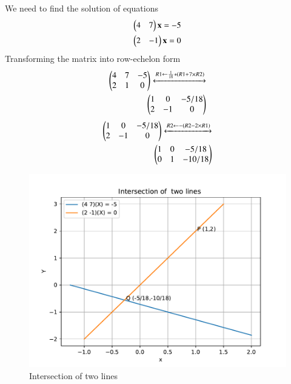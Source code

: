 	We need to find the solution of equations
	\begin{align}
	\begin{pmatrix}4 & 7\end{pmatrix}\textbf{x} = - 5 \label{eq:solutions/line_plane/52n1} \\
	\begin{pmatrix}2 & - 1\end{pmatrix}\textbf{x} = 0\label{eq:solutions/line_plane/52n2}
	\end{align}
	Transforming the matrix into row-echelon form \\
	\begin{align}
	\begin{pmatrix}
		4 & 7 & -5 \\
		2 & 1 & 0\\
	\end{pmatrix}
	\xleftrightarrow[]{R1 \leftarrow \frac{1}{18}*(R1+ 7 \times R2) } \nonumber \label{eq:solutions/line_plane/52n4} \\
	\begin{pmatrix}
		1 & 0 & -5/18 \\
		2 & -1 & 0
	\end{pmatrix}
	\end{align}
	\begin{align}
	\begin{pmatrix}
		1 & 0 & -5/18 \\
		2 & -1 & 0
	\end{pmatrix}
	\xleftrightarrow[]{R2 \leftarrow  -(R2- 2 \times R1) } \nonumber \label{eq:solutions/line_plane/52n5}  \\
	\begin{pmatrix}
		1 & 0 & -5/18 \\
		0 & 1 & -10/18
	\end{pmatrix}
	\end{align}




\begin{figure}[htb!]	
	\centering	
	\includegraphics[width=.50\textwidth, height=.30\textheight]{./solutions/line_plane/52/Figure.pdf}	
	\caption{Intersection of two lines}
	\label{fig1:solutions/line_plane/52}	
\end{figure}



